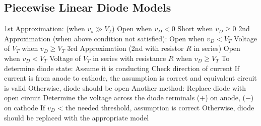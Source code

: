 \documentclass[a4paper,11pt]{article}
\begin{document}
	\subsection{Piecewise Linear Diode Models}
	\begin{outline}[enumerate]
		\1 1st Approximation: (when $v_{s} \gg V_{T}$)
			\2 Open when $v_{D} < 0$
			\2 Short when $v_{D} \geq 0$
		\1 2nd Approximation (when above condition not satisfied):
			\2 Open when $v_{D} < V_{T}$
			\2 Voltage of $V_{T}$ when $v_{D} \geq V_{T}$
		\1 3rd Approximation (2nd with resistor $R$ in series)
			\2 Open when $v_{D} < V_{T}$
			\2 Voltage of $V_{T}$ in series with resistance $R$ when $v_{D} \geq V_{T}$	
		\1 To determine diode state: 
			\2 Assume it is conducting 	
			\2 Check direction of current
			\2 If current is from anode to cathode, the assumption is correct and equivalent circuit is valid
			\2 Otherwise, diode should be open
		\1 Another method:
			\2 Replace diode with open circuit 
			\2 Determine the voltage across the diode terminals ($+$) on anode, ($-$) on cathode
			\2 If $v_{D}$ < the needed threshold, assumption is correct 
			\2 Otherwise, diode should be replaced with the appropriate model
	\end{outline}

	\newpage
\end{document}
